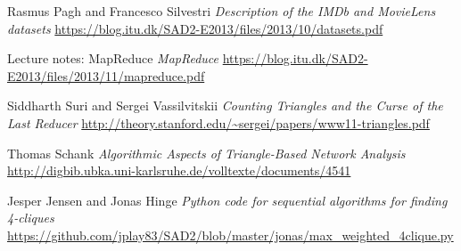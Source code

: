 \documentclass{article}
\begin{document}
\begin{thebibliography}{1}

    Rasmus Pagh and Francesco Silvestri
    \emph{Description of the IMDb and MovieLens datasets}
    \url{https://blog.itu.dk/SAD2-E2013/files/2013/10/datasets.pdf}

    Lecture notes: MapReduce
    \emph{MapReduce}
    \url{https://blog.itu.dk/SAD2-E2013/files/2013/11/mapreduce.pdf}

    Siddharth Suri and Sergei Vassilvitskii
    \emph{Counting Triangles and the Curse of the Last Reducer}
    \url{http://theory.stanford.edu/~sergei/papers/www11-triangles.pdf}

    Thomas Schank
    \emph{Algorithmic Aspects of Triangle-Based Network Analysis}
    \url{http://digbib.ubka.uni-karlsruhe.de/volltexte/documents/4541}

    Jesper Jensen and Jonas Hinge
    \emph{Python code for sequential algorithms for finding 4-cliques}
    \url{https://github.com/jplay83/SAD2/blob/master/jonas/max_weighted_4clique.py}
    
\end{thebibliography}
\end{document}
